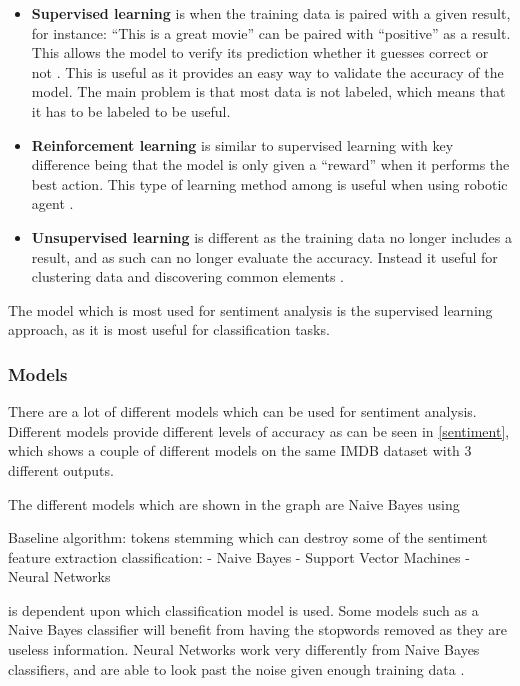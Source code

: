 \begin{itemize}
  \item \textbf{Supervised learning} is when the training data is paired with a
  given result, for instance: ``This is a great movie'' can be paired with
  ``positive'' as a result. This allows the model to verify its prediction
  whether it guesses correct or not \citep[Ch. 7.0]{MIBook}\KT. This is useful
  as it provides an easy way to validate the accuracy of the model. The main problem
  is that most data is not labeled, which means that it has to be labeled to be
  useful.
  \item \textbf{Reinforcement learning} is similar to supervised learning with
  key difference being that the model is only given a ``reward'' when it
  performs the best action. This type of learning method among is useful when
  using robotic agent \citep{Reinforcement}.
  \item \textbf{Unsupervised learning} is different as the training data no
  longer includes a result, and as such can no longer evaluate the accuracy.
  Instead it useful for clustering data and discovering common elements
  \citep[Ch. 11.1]{MIBook}\KT.
\end{itemize}

The model which is most used for sentiment analysis is the supervised learning
approach, as it is most useful for classification tasks.

\subsubsection{Models}\label{subsub:Models}

There are a lot of different models which can be used for sentiment analysis. 
Different models provide different levels of accuracy as can be seen in
\autoref{sentiment}, which shows a couple of different models on the same IMDB
dataset with 3 different outputs\citep{Classification}.


The different models which are shown in the graph are Naive Bayes using 





Baseline algorithm:
tokens
stemming which can destroy some of the sentiment
feature extraction
classification:
- Naive Bayes
- Support Vector Machines
- Neural Networks



 is dependent upon which classification model is used. Some models
such as a Naive Bayes classifier will benefit from having the stopwords removed
as they are useless information. Neural Networks work very differently from
Naive Bayes classifiers, and are able to look past the noise given enough
training data \Source.\nl